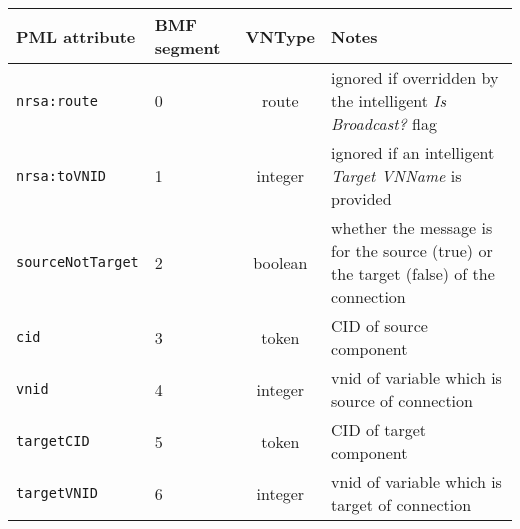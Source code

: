 \documentclass[pdftex,a4paper]{article}
\newcommand{\XMLfont}[1]{{\tt \small #1}}
\begin{document}
\begin{table}[!h]
  \begin{center}
    \label{tab:DeleteLink}
    \begin{tabular}{|l|p{13mm}|c|p{60mm}|}
      \hline

      \textbf{PML attribute} & \textbf{BMF segment} & \textbf{VNType}
      & \textbf{Notes} \\\hline

      \XMLfont{nrsa:route} & 0 & route & ignored if overridden by the
      intelligent {\em Is Broadcast?} flag \\\hline

      \XMLfont{nrsa:toVNID} & 1 & integer & ignored if an intelligent {\em
      Target VNName} is provided \\\hline

      \XMLfont{sourceNotTarget} & 2 & boolean & whether the message is
      for the source (true) or the target (false) of the connection
      \\\hline

      \XMLfont{cid} & 3 & token & CID of source component
      \\\hline

      \XMLfont{vnid} & 4 & integer & vnid of variable which is
      source of connection \\\hline


      \XMLfont{targetCID} & 5 & token & CID of target component
      \\\hline

      \XMLfont{targetVNID} & 6 & integer & vnid of variable
      which is target of connection \\\hline



    \end{tabular}
  \end{center}
\end{table}
\end{document}
